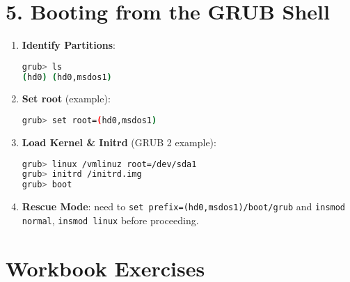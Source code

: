 \documentclass[a4paper]{report}
\begin{document}
\section*{5. Booting from the GRUB Shell}

\begin{enumerate}
    \item \textbf{Identify Partitions}:
    \begin{lstlisting}[language=bash]
grub> ls
(hd0) (hd0,msdos1)
    \end{lstlisting}

    \item \textbf{Set root} (example):
    \begin{lstlisting}[language=bash]
grub> set root=(hd0,msdos1)
    \end{lstlisting}

    \item \textbf{Load Kernel \& Initrd} (GRUB 2 example):
    \begin{lstlisting}[language=bash]
grub> linux /vmlinuz root=/dev/sda1
grub> initrd /initrd.img
grub> boot
    \end{lstlisting}

    \item \textbf{Rescue Mode}: need to \texttt{set prefix=(hd0,msdos1)/boot/grub} and \texttt{insmod normal}, \texttt{insmod linux} before proceeding.
\end{enumerate}

\section*{Workbook Exercises}
\end{document}
